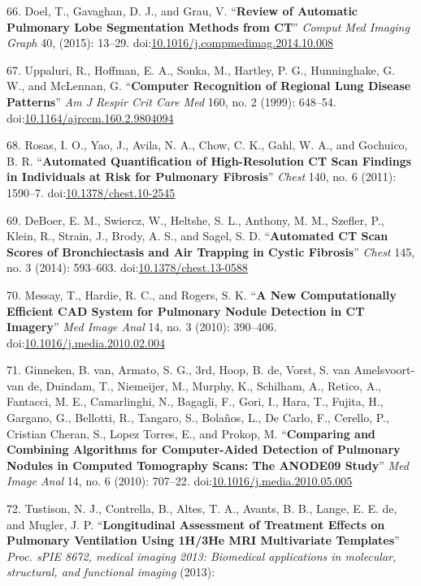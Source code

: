 \documentclass[11pt,]{article}
\begin{document}
66. Doel, T., Gavaghan, D. J., and Grau, V. ``\textbf{Review of
Automatic Pulmonary Lobe Segmentation Methods from CT}'' \emph{Comput
Med Imaging Graph} 40, (2015): 13--29.
doi:\href{http://dx.doi.org/10.1016/j.compmedimag.2014.10.008}{10.1016/j.compmedimag.2014.10.008}

67. Uppaluri, R., Hoffman, E. A., Sonka, M., Hartley, P. G.,
Hunninghake, G. W., and McLennan, G. ``\textbf{Computer Recognition of
Regional Lung Disease Patterns}'' \emph{Am J Respir Crit Care Med} 160,
no. 2 (1999): 648--54.
doi:\href{http://dx.doi.org/10.1164/ajrccm.160.2.9804094}{10.1164/ajrccm.160.2.9804094}

68. Rosas, I. O., Yao, J., Avila, N. A., Chow, C. K., Gahl, W. A., and
Gochuico, B. R. ``\textbf{Automated Quantification of High-Resolution CT
Scan Findings in Individuals at Risk for Pulmonary Fibrosis}''
\emph{Chest} 140, no. 6 (2011): 1590--7.
doi:\href{http://dx.doi.org/10.1378/chest.10-2545}{10.1378/chest.10-2545}

69. DeBoer, E. M., Swiercz, W., Heltshe, S. L., Anthony, M. M., Szefler,
P., Klein, R., Strain, J., Brody, A. S., and Sagel, S. D.
``\textbf{Automated CT Scan Scores of Bronchiectasis and Air Trapping in
Cystic Fibrosis}'' \emph{Chest} 145, no. 3 (2014): 593--603.
doi:\href{http://dx.doi.org/10.1378/chest.13-0588}{10.1378/chest.13-0588}

70. Messay, T., Hardie, R. C., and Rogers, S. K. ``\textbf{A New
Computationally Efficient CAD System for Pulmonary Nodule Detection in
CT Imagery}'' \emph{Med Image Anal} 14, no. 3 (2010): 390--406.
doi:\href{http://dx.doi.org/10.1016/j.media.2010.02.004}{10.1016/j.media.2010.02.004}

71. Ginneken, B. van, Armato, S. G., 3rd, Hoop, B. de, Vorst, S. van
Amelsvoort-van de, Duindam, T., Niemeijer, M., Murphy, K., Schilham, A.,
Retico, A., Fantacci, M. E., Camarlinghi, N., Bagagli, F., Gori, I.,
Hara, T., Fujita, H., Gargano, G., Bellotti, R., Tangaro, S., Bola{ñ}os,
L., De Carlo, F., Cerello, P., Cristian Cheran, S., Lopez Torres, E.,
and Prokop, M. ``\textbf{Comparing and Combining Algorithms for
Computer-Aided Detection of Pulmonary Nodules in Computed Tomography
Scans: The ANODE09 Study}'' \emph{Med Image Anal} 14, no. 6 (2010):
707--22.
doi:\href{http://dx.doi.org/10.1016/j.media.2010.05.005}{10.1016/j.media.2010.05.005}

72. Tustison, N. J., Contrella, B., Altes, T. A., Avants, B. B., Lange,
E. E. de, and Mugler, J. P. ``\textbf{Longitudinal Assessment of
Treatment Effects on Pulmonary Ventilation Using 1H/3He MRI Multivariate
Templates}'' \emph{Proc. sPIE 8672, medical imaging 2013: Biomedical
applications in molecular, structural, and functional imaging} (2013):
\end{document}

